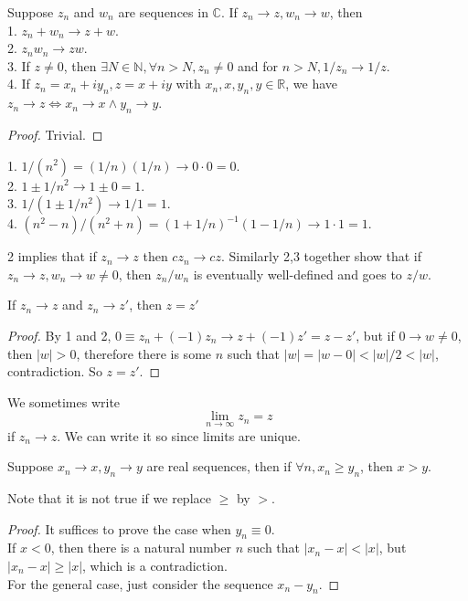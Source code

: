 \begin{proposition}
    Suppose $z_n$ and $w_n$ are sequences in $\mathbb C$.
    If $z_n\to z,w_n\to w$, then\\
    1. $z_n+w_n\to z+w$.\\
    2. $z_nw_n\to zw$.\\
    3. If $z\neq 0$, then $\exists N\in\mathbb N,\forall n>N,z_n\neq 0$ and for $n>N,1/z_n\to 1/z$.\\
    4. If $z_n=x_n+iy_n,z=x+iy$ with $x_n,x,y_n,y\in\mathbb R$, we have $z_n\to z\iff x_n\to x\land y_n\to y$.
\end{proposition}
\begin{proof}
    Trivial.
\end{proof}
\begin{example}
    1. $1/(n^2)=(1/n)(1/n)\to 0\cdot 0=0$.\\
    2. $1\pm1/n^2\to 1\pm0=1$.\\
    3. $1/(1\pm 1/n^2)\to 1/1=1$.\\
    4. $(n^2-n)/(n^2+n)=(1+1/n)^{-1}(1-1/n)\to 1\cdot 1=1$.
\end{example}
\begin{remark}
    2 implies that if $z_n\to z$ then $cz_n\to cz$.
    Similarly 2,3 together show that if $z_n\to z,w_n\to w\neq 0$, then $z_n/w_n$ is eventually well-defined and goes to $z/w$.
\end{remark}
\begin{corollary}
    If $z_n\to z$ and $z_n\to z'$, then $z=z'$
\end{corollary}
\begin{proof}
    By 1 and 2, $0\equiv z_n+(-1)z_n\to z+(-1)z'=z-z'$, but if $0\to w\neq 0$, then $|w|>0$, therefore there is some $n$ such that $|w|=|w-0|<|w|/2<|w|$, contradiction.
    So $z=z'$.
\end{proof}
We sometimes write
$$\lim_{n\to\infty}z_n=z$$
if $z_n\to z$.
We can write it so since limits are unique.
\begin{proposition}
    Suppose $x_n\to x,y_n\to y$ are real sequences, then if $\forall n,x_n\ge y_n$, then $x>y$.
\end{proposition}
Note that it is not true if we replace $\ge$ by $>$.
\begin{proof}
    It suffices to prove the case when $y_n\equiv 0$.\\
    If $x<0$, then there is a natural number $n$ such that $|x_n-x|<|x|$, but $|x_n-x|\ge|x|$, which is a contradiction.\\
    For the general case, just consider the sequence $x_n-y_n$.
\end{proof}
